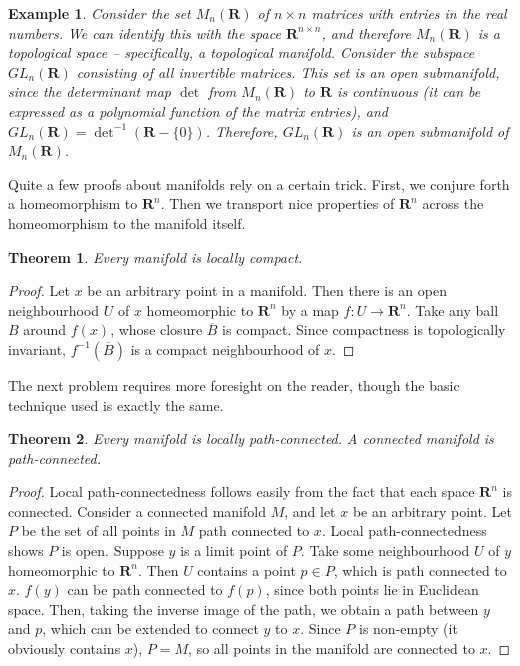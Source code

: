 \documentclass[12pt]{report}
\theoremstyle{plain}
\newtheorem{theorem}{Theorem}[chapter]
\newtheorem*{example}{Example}
\theoremstyle{definition}
\begin{document}
\begin{example}
    Consider the set $M_n(\mathbf{R})$ of $n \times n$ matrices with entries in the real numbers. We can identify this with the space $\mathbf{R}^{n \times n}$, and therefore $M_n(\mathbf{R})$ is a topological space -- specifically, a topological manifold. Consider the subspace $GL_n(\mathbf{R})$ consisting of all invertible matrices. This set is an open submanifold, since the determinant map $\det$ from $M_n(\mathbf{R})$ to $\mathbf{R}$ is continuous (it can be expressed as a polynomial function of the matrix entries), and $GL_n(\mathbf{R}) = \det^{-1}(\mathbf{R} - \{0\})$. Therefore, $GL_n(\mathbf{R})$ is an open submanifold of $M_n(\mathbf{R})$.
\end{example}

Quite a few proofs about manifolds rely on a certain trick. First, we conjure forth a homeomorphism to $\mathbf{R}^n$. Then we transport nice properties of $\mathbf{R}^n$ across the homeomorphism to the manifold itself.

\begin{theorem}
    Every manifold is locally compact.
\end{theorem}
\begin{proof}
    Let $x$ be an arbitrary point in a manifold. Then there is an open neighbourhood $U$ of $x$ homeomorphic to $\mathbf{R}^n$ by a map $f:U \to \mathbf{R}^n$. Take any ball $B$ around $f(x)$, whose closure $\overline{B}$ is compact. Since compactness is topologically invariant, $f^{-1}(\overline{B})$ is a compact neighbourhood of $x$.
\end{proof}

The next problem requires more foresight on the reader, though the basic technique used is exactly the same.

\begin{theorem}
    Every manifold is locally path-connected. A connected manifold is path-connected.
\end{theorem}
\begin{proof}
    Local path-connectedness follows easily from the fact that each space $\mathbf{R}^n$ is connected. Consider a connected manifold $M$, and let $x$ be an arbitrary point. Let $P$ be the set of all points in $M$ path connected to $x$. Local path-connectedness shows $P$ is open. Suppose $y$ is a limit point of $P$. Take some neighbourhood $U$ of $y$ homeomorphic to $\mathbf{R}^n$. Then $U$ contains a point $p \in P$, which is path connected to $x$. $f(y)$ can be path connected to $f(p)$, since both points lie in Euclidean space. Then, taking the inverse image of the path, we obtain a path between  $y$ and $p$, which can be extended to connect $y$ to $x$. Since $P$ is non-empty (it obviously contains $x$), $P = M$, so all points in the manifold are connected to $x$.
\end{proof}
\end{document}

